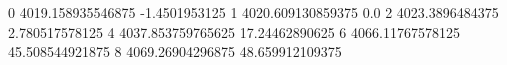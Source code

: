 0 4019.158935546875 -1.4501953125
1 4020.609130859375 0.0
2 4023.3896484375 2.780517578125
4 4037.853759765625 17.24462890625
6 4066.11767578125 45.508544921875
8 4069.26904296875 48.659912109375
